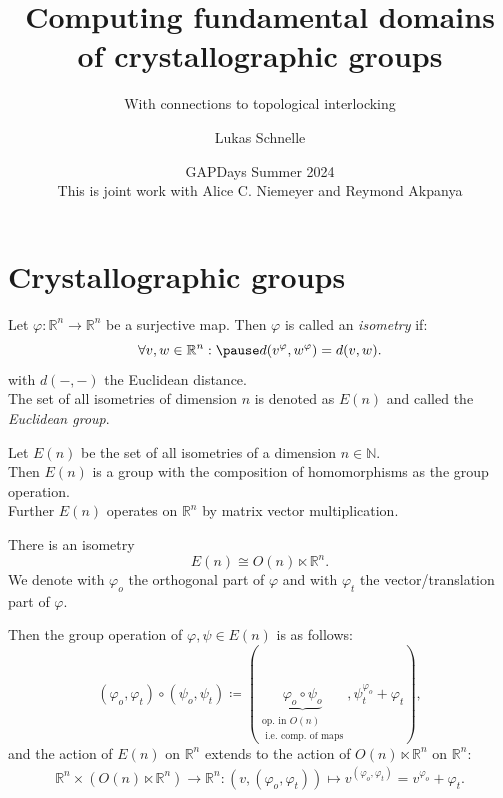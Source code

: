 \documentclass{beamer}
\title{Computing fundamental domains of crystallographic groups}
\subtitle{With connections to topological interlocking}
\author{Lukas Schnelle}
\date{GAPDays Summer 2024 \\ This is joint work with Alice C. Niemeyer and Reymond Akpanya}
\theoremstyle{plain}
\newcommand\R{\mathbb R}
\newcommand\N{\mathbb N}
\renewcommand{\phi}{\varphi}
\begin{document}
\frame[plain]{\titlepage}

\section{Crystallographic groups}

\begin{frame}
    \begin{definition}[Isometry]\label{def:isometry}
        Let $\phi:\R^n \to \R^n$ be a surjective map. 
        Then $\phi$ is called an \emph{isometry} if:
        $$
            \forall v, w \in \R^n : \pause d(v^\phi, w^\phi) = d(v,w).
        $$
        with $d(-,-)$ the Euclidean distance.\\ \pause 
        The set of all isometries of dimension $n$ is denoted as $E(n)$ and called the \emph{Euclidean group}.
    \end{definition}
    \pause
    \begin{lemma}\label{lma:isom-is-grp}
        Let $E(n)$ be the set of all isometries of a dimension $n \in \N$. \\ \pause
        Then $E(n)$ is a group with the composition of homomorphisms as the group operation. \\
        Further $E(n)$ operates on $\R^n$ by matrix vector multiplication.
    \end{lemma}
\end{frame}

\begin{frame}
    \begin{proposition}
        There is an isometry
        $$
            E(n) \cong O(n) \ltimes \R^n.
        $$
        We denote with $\phi_o$ the orthogonal part of $\phi$ and with $\phi_t$ the vector/translation part of $\phi$.
    \end{proposition}

    Then the group operation of $\phi, \psi \in E(n)$ is as follows:\pause
    $$
        (\phi_o, \phi_t) \circ (\psi_o, \psi_t) \coloneqq (\underbrace{\phi_o \circ \psi_o}_{\substack{\text{op. in }O(n)\\ \text{ i.e. comp. of maps}}}, \psi_t^{\phi_o} + \phi_t),
    $$\pause
    and the action of $E(n)$ on $\R^n$ extends to the action of $O(n) \ltimes \R^n$ on $\R^n$:\pause
    \begin{align*} \label{align:semidirect-action}
        \R^n \times ( O(n) \ltimes \R^n) \to \R^n: (v, (\phi_o, \phi_t)) \mapsto v^{(\phi_o, \phi_t)} = v^{\phi_o} + \phi_t.
    \end{align*}
\end{frame}
\end{document}
